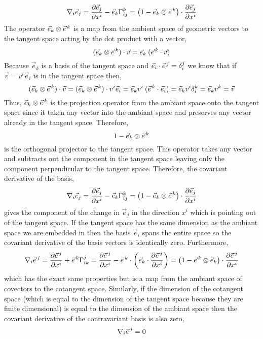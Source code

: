 \documentclass[11pt, a4paper]{article}
\begin{document}
\[ \nabla_i \vec{e}_j = \frac{\partial{\vec{e}_j}}{\partial{x^i}} - \vec{e}_k \Gamma^k_{ij} = \left( 1 - \vec{e}_k \otimes \vec{e}^{\, k} \right) \cdot \frac{\partial{\vec{e}_j}}{\partial{x^i}} \]
The operator  $\vec{e}_k \otimes \vec{e}^{\, k}$ is a map from the ambient space of geometric vectors to the tangent space acting by the dot product with a vector,
\[ (\vec{e}_k \otimes \vec{e}^{\, k}) \cdot \vec{v} = \vec{e}_k \: (\vec{e}^{\, k} \cdot \vec{v}) \]
Because $\vec{e}_k$ is a basis of the tangent space and $\vec{e}_i \cdot \vec{e}^{\, j} = \delta_i^j$ we know that if $\vec{v} = v^i \vec{e}_i$ is in the tangent space then,
\[ (\vec{e}_k \otimes \vec{e}^{\, k}) \cdot \vec{v} = (\vec{e}_k \otimes \vec{e}^{\, k}) \cdot v^i \vec{e}_i = \vec{e}_k v^i \: (\vec{e}^{\, k} \cdot \vec{e}_i) = \vec{e}_k v^i \delta^k_i = \vec{e}_k v^k = \vec{v}  \]
Thus, $\vec{e}_k \otimes \vec{e}^{\, k}$ is the projection operator from the ambiant space onto the tangent space since it taken any vector into the ambiant space and preserves any vector already in the tangent space. Therefore, 
\[ 1 - \vec{e}_k \otimes \vec{e}^{\, k} \]
is the orthogonal projector to the tangent space. This operator takes any vector and subtracts out the component in the tangent space leaving only the component perpendicular to the tangent space. Therefore, the covariant derivative of the basis,
\[ \nabla_i \vec{e}_j = \frac{\partial{\vec{e}_j}}{\partial{x^i}} - \vec{e}_k \Gamma^k_{ij} = \left( 1 - \vec{e}_k \otimes \vec{e}^{\, k} \right) \cdot \frac{\partial{\vec{e}_j}}{\partial{x^i}} \]
gives the component of the change in $\vec{e}_j$ in the direction $x^i$ which is pointing out of the tangent space. If the tangent space has the same dimension as the ambiant space we are embedded in then the basis $\vec{e}_i$ spans the entire space so the covariant derivative of the basis vectors is identically zero. Furthermore, 
\[ \nabla_i \vec{e}^{\, j} = \frac{\partial{\vec{e}^{\, j}}}{\partial{x^i}} + \vec{e}^{\, k} \Gamma^j_{ik} = \frac{\partial{\vec{e}^{\, j}}}{\partial{x^i}} - \vec{e}^{\, k}  \cdot \left( \vec{e}_k \cdot \frac{\partial{\vec{e}^{\, j}}}{\partial{x^i}} \right) = \left(1 - \vec{e}^{\, k} \otimes \vec{e}_k \right) \cdot \frac{\partial{\vec{e}^{\, j}}}{\partial{x^i}} \]
which has the exact same properties but is a map from the ambiant space of covectors to the cotangent space. Similarly, if the dimension of the cotangent space (which is equal to the dimension of the tangent space because they are finite dimensional) is equal to the dimension of the ambiant space then the covariant derivative of the contravariant basis is also zero,
\[ \nabla_i \vec{e}^{\, j} = 0 \]
\end{document}
